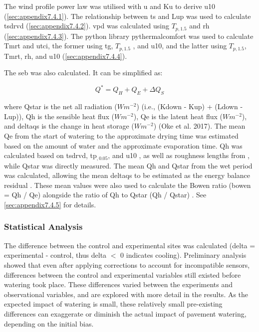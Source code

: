 \documentclass[final,3p,times,authoryear]{elsarticle}
\begin{document}
The wind profile power law \citep{Manwell2010,Banuelos-Ruedas2010} was
utilised with \gls{u} and \gls{Ku}  to derive \gls{u10} (\ref{sec:appendix7.4.1}). The relationship between \gls{ts} and \gls{Lup} \citep{Oke2017} was used to calculate \gls{tsdrvd} (\ref{sec:appendix7.4.2}). \gls{vpd} was calculated using $T_{p,1.5}$ and \gls{rh} \citep{Allen1998,McMahon2013} (\ref{sec:appendix7.4.3}). The python library pythermalcomfort \citep{Tartarini2020} was used to calculate \gls{Tmrt} and \gls{utci}, the former using \gls{tg}, $T_{p,1.5}$ , and \gls{u10}, and the latter using $T_{p,1.5}$, \gls{Tmrt}, \gls{rh}, and \gls{u10} (\ref{sec:appendix7.4.4}).

The \gls{seb} was also calculated. It can be simplified as:

\begin{equation}
Q^{*} = Q_{H} + Q_{E} + \Delta Q_{S}
\label{eq:2.1} 
\end{equation}

where \gls{Qstar} is the net all radiation ($Wm^{-2}$) (i.e., (\gls{Kdown} - \gls{Kup}) + (\gls{Ldown} - \gls{Lup})), \gls{Qh} is the sensible heat flux ($Wm^{-2}$), \gls{Qe} is the latent heat flux ($Wm^{-2}$), and \gls{deltaqs} is the change in heat storage ($Wm^{-2}$) (Oke et al. 2017). The mean \gls{Qe} from the start of watering to the approximate drying time was estimated based on the amount of water and the approximate evaporation time. \gls{Qh} was calculated based on \gls{tsdrvd}, \gls{tp}$_{,0.05}$, and \gls{u10} \citep{Liu2007}, as well as roughness lengths from \cite{Kanda2007}, while \gls{Qstar} was directly measured. The mean \gls{Qh} and \gls{Qstar} from the wet period was calculated, allowing the mean \gls{deltaqs} to be estimated as the energy balance residual \citep{Oke2017}. These mean values were also used to calculate the Bowen ratio (\gls{bowen} = \gls{Qh} / \gls{Qe}) alongside the ratio of \gls{Qh} to \gls{Qstar} (\gls{Qh} / \gls{Qstar}) \citep{Oke2017}. See \ref{sec:appendix7.4.5} for details.


\subsubsection{Statistical Analysis}\label{sec:methods2.2.3}

The difference between the control and experimental sites was calculated (\gls{delta} = experimental - control, thus \gls{delta} $<$ 0 indicates cooling). Preliminary analysis showed that even after applying corrections to account for incompatible sensors, differences between the control and experimental variables still existed before watering took place. These differences varied between the experiments and observational variables, and are explored with more detail in the results. As the expected impact of watering is small, these relatively small pre-existing differences can exaggerate or diminish the actual impact of pavement watering, depending on the initial bias.
\end{document}
